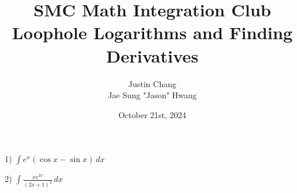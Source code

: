 \documentclass[11pt]{article}
\title{SMC Math Integration Club\\Loophole Logarithms and Finding Derivatives }
\author{Justin Chang\\Jae Sung "Jason" Hwang}
\date{October 21st, 2024}
\begin{document}
\maketitle
\pagebreak


1) ${\displaystyle \int e^{x}(\cos{x}-\sin{x})\,dx}$ \newline

\pagebreak

2) ${\displaystyle \int  \frac{xe^{2x}}{(2x+1)^{2}}\,dx}$ \newline
\end{document}
